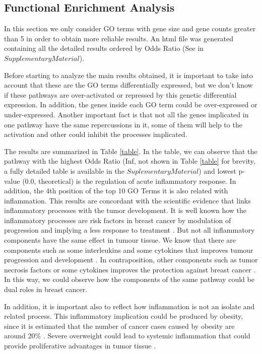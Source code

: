 \documentclass[9pt,twocolumn,twoside]{gsajnl}
\begin{document}
\subsection*{Functional Enrichment Analysis} 
\vspace{2mm}

In this section we only 
consider GO terms with gene size and gene counts greater than 5 in order to obtain more reliable results. An html file was generated containing all the detailed results ordered by Odds Ratio (See in $Supplementary Material$).
\vspace{2mm}

Before starting to analyze the main results obtained, it is important to take into account that these are the GO terms differentially expressed, but we don't know if these pathways are over-activated or repressed by this genetic differential expression. In addition, the genes inside each GO term could be over-expressed or under-expressed. Another important fact is that not all the genes implicated in one pathway have the same repercussions in it, some of them will help to the activation and other could inhibit the processes implicated. 
\vspace{2mm}

The results are summarized in Table \ref{table}. In the table, we can observe that the pathway with the highest Odds Ratio (Inf, not shown in Table \ref{table} for brevity, a fully detailed table is available in the $Suplementary Material$) and lowest p-value (0.0, theoretical) is the regulation of acute inflammatory response. In addition, the 4th position of the top 10 GO Terms it is also related with inflammation. This results are concordant with the scientific evidence that links inflammatory processes with the tumor development. It is well known how the inflammatory processes are risk factors in breast cancer by modulation of progression and implying a less response to treatment \citep{Murray01022015}. But not all inflammatory components have the same effect in tumour tissue. We know that there are components such as some interleukins and some cytokines that improves tumour progression and development \citep{Esquivel-Velzquez2014}. In contraposition, other components such as tumor necrosis factors or some cytokines improves the protection against breast cancer \citep{Esquivel-Velzquez2014}. In this way, we could observe how the components of the same pathway could be dual roles in breast cancer. 
\vspace{2mm}

In addition, it is important also to reflect how inflammation is not an isolate and related process. This inflammatory implication could be produced by obesity, since it is estimated that the number of cancer cases caused by obesity are around 20\% \citep{DePergola2013,BaumgartenFrasor}. Severe overweight could lead to systemic inflammation that could provide proliferative advantages in tumor tissue \citep{Iyengar2013}.
\vspace{2mm}
\end{document}
